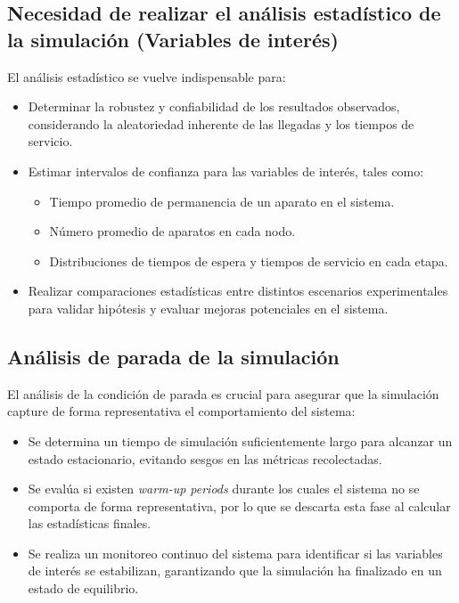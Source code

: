 \documentclass[a4paper,12pt]{article}
\begin{document}
\subsection{Necesidad de realizar el análisis estadístico de la simulación (Variables de interés)}
El análisis estadístico se vuelve indispensable para:
\begin{itemize}
    \item Determinar la robustez y confiabilidad de los resultados observados, considerando la aleatoriedad inherente de las llegadas y los tiempos de servicio.
    \item Estimar intervalos de confianza para las variables de interés, tales como:
    \begin{itemize}
        \item Tiempo promedio de permanencia de un aparato en el sistema.
        \item Número promedio de aparatos en cada nodo.
        \item Distribuciones de tiempos de espera y tiempos de servicio en cada etapa.
    \end{itemize}
    \item Realizar comparaciones estadísticas entre distintos escenarios experimentales para validar hipótesis y evaluar mejoras potenciales en el sistema.
\end{itemize}

\subsection{Análisis de parada de la simulación}
El análisis de la condición de parada es crucial para asegurar que la simulación capture de forma representativa el comportamiento del sistema:
\begin{itemize}
    \item Se determina un tiempo de simulación suficientemente largo para alcanzar un estado estacionario, evitando sesgos en las métricas recolectadas.
    \item Se evalúa si existen \emph{warm-up periods} durante los cuales el sistema no se comporta de forma representativa, por lo que se descarta esta fase al calcular las estadísticas finales.
    \item Se realiza un monitoreo continuo del sistema para identificar si las variables de interés se estabilizan, garantizando que la simulación ha finalizado en un estado de equilibrio.
\end{itemize}
\end{document}
